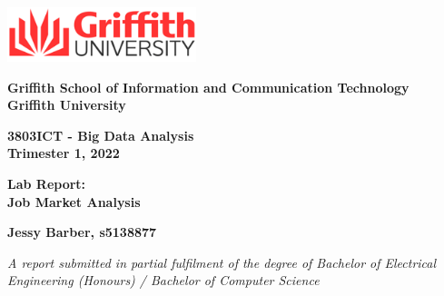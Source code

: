 \documentclass[twoside, 12pt, a4paper]{article}
\newenvironment{myindentpar}[1]%
{\begin{list}{}%
		{\setlength{\leftmargin}{#1}}%
		\item[]%
	}
	{\end{list}}
\begin{document}
\begin{titlepage}
\begin{flushright}
	\includegraphics[height=60px]{griffithlogo.png}
\end{flushright}
\begin{large}
\textbf{Griffith School of Information and Communication Technology}\\
\textbf{Griffith University}

\vspace*{8mm}

\textbf{3803ICT - Big Data Analysis}\\
\textbf{Trimester 1, 2022}
\end{large}

\vspace*{15mm}

\begin{Huge}
\begin{center}
\textbf{Lab Report:}\\
\textbf{Job Market Analysis}
\end{center}
\end{Huge}

\vspace*{5mm}
\begin{large}


\vspace*{8mm}

\textbf{Jessy Barber, s5138877}\\
\newline

\vspace*{8mm}
\begin{myindentpar}{2cm}
\emph{A report submitted in partial fulfilment of the degree of Bachelor of Electrical Engineering (Honours) / Bachelor of Computer Science}
\end{myindentpar}



\end{large}


\vfill

\end{titlepage}

\end{document}
